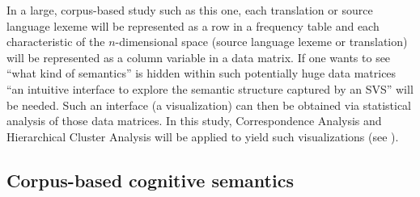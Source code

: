 In a large, corpus-based study such as this one, each translation or source language lexeme will be represented as a row in a frequency table and each characteristic of the $n$-dimensional space (source language lexeme or translation) will be represented as a column variable in a data matrix. If one wants to see “what kind of semantics” \citep[17]{heylen_looking_2012} is hidden within such potentially huge data matrices “an intuitive interface to explore the semantic structure captured by an SVS” \citep[17]{heylen_looking_2012} will be needed. Such an interface (a visualization) can then be obtained via statistical analysis of those data matrices. In this study, Correspondence Analysis and Hierarchical Cluster Analysis will be applied to yield such visualizations (see ).

\subsection{Corpus-based cognitive semantics}
\label{sec:2.4.3}  
